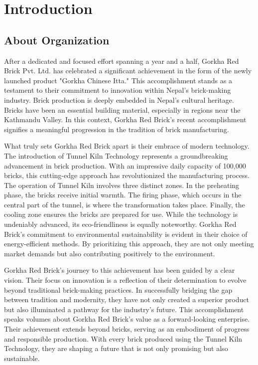 \section{Introduction}
\subsection{About Organization}
After a dedicated and focused effort spanning a year and a half, Gorkha Red Brick Pvt. Ltd. has celebrated a significant achievement in the form of the newly launched product "Gorkha Chinese Itta." This accomplishment stands as a testament to their commitment to innovation within Nepal's brick-making industry. Brick production is deeply embedded in Nepal's cultural heritage. Bricks have been an essential building material, especially in regions near the Kathmandu Valley. In this context, Gorkha Red Brick's recent accomplishment signifies a meaningful progression in the tradition of brick manufacturing.

\vspace{0.4cm}
What truly sets Gorkha Red Brick apart is their embrace of modern technology. The introduction of Tunnel Kiln Technology represents a groundbreaking advancement in brick production. With an impressive daily capacity of 100,000 bricks, this cutting-edge approach has revolutionized the manufacturing process.
The operation of Tunnel Kiln involves three distinct zones. In the preheating phase, the bricks receive initial warmth. The firing phase, which occurs in the central part of the tunnel, is where the transformation takes place. Finally, the cooling zone ensures the bricks are prepared for use.
While the technology is undeniably advanced, its eco-friendliness is equally noteworthy. Gorkha Red Brick's commitment to environmental sustainability is evident in their choice of energy-efficient methods. By prioritizing this approach, they are not only meeting market demands but also contributing positively to the environment.

\vspace{0.4cm}
Gorkha Red Brick's journey to this achievement has been guided by a clear vision. Their focus on innovation is a reflection of their determination to evolve beyond traditional brick-making practices. In successfully bridging the gap between tradition and modernity, they have not only created a superior product but also illuminated a pathway for the industry's future.
This accomplishment speaks volumes about Gorkha Red Brick's value as a forward-looking enterprise. Their achievement extends beyond bricks, serving as an embodiment of progress and responsible production. With every brick produced using the Tunnel Kiln Technology, they are shaping a future that is not only promising but also sustainable.